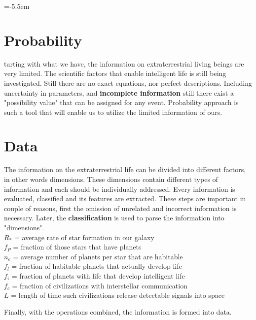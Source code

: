\documentclass{ieeeaccess}
\begin{document}
\titlepgskip=-5.5em

\maketitle

\section{Probability}
tarting with what we have, the information on extraterrestrial living beings are very limited.
The scientific factors that enable intelligent life is still being investigated.
Still there are no exact equations, nor perfect descriptions.
Including uncertainty in parameters, and \textbf{incomplete information} still there exist a "possibility value" that can be assigned for any event. 
Probability approach is such a tool that will enable us to utilize the limited information of ours.

\vspace{-1em}
\section{Data}
The information on the extraterrestrial life can be divided into different factors, in other words dimensions.
These dimensions contain different types of information and each should be individually addressed. 
Every information is evaluated, classified and its features are extracted.
These steps are important in couple of reasons, first the omission of unrelated and incorrect information is necessary. Later, the \textbf{classification} is used to parse the information into "dimensions".\\
$R_*$ = average rate of star formation in our galaxy \\
$f_P$ = fraction of those stars that have planets \\
$n_e$ = average number of planets per star that are habitable \\
$f_l$ = fraction of habitable planets that actually develop life \\
$f_i$ = fraction of planets with life that develop intelligent life \\
$f_c$ = fraction of civilizations with interstellar communication \\
$L$ = length of time such civilizations release detectable signals into space
\switchcolumn

Finally, with the operations combined, the information is formed into data. 
\vspace{-1em}
\end{document}
